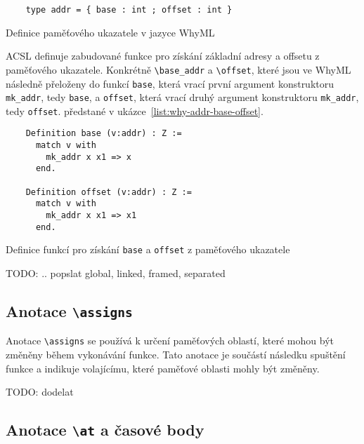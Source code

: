 \begin{listing}[H]
    \begin{verbatim}
    type addr = { base : int ; offset : int }
    \end{verbatim}
    \caption{Definice paměťového ukazatele v jazyce WhyML}
    \label{list:why-addr}
\end{listing}

ACSL definuje zabudované funkce pro získání základní adresy a offsetu z paměťového ukazatele.
Konkrétně \texttt{\textbackslash base\_addr} a \texttt{\textbackslash offset},
které jsou ve WhyML následně přeloženy do funkcí \texttt{base},
která vrací první argument konstruktoru \texttt{mk\_addr}, tedy \texttt{base},
a \texttt{offset}, která vrací druhý argument konstruktoru \texttt{mk\_addr}, tedy \texttt{offset}.
předstané v ukázce~\ref{list:why-addr-base-offset}.

\begin{listing}[H]
    \begin{verbatim}
    Definition base (v:addr) : Z :=
      match v with
        mk_addr x x1 => x
      end.

    Definition offset (v:addr) : Z :=
      match v with
        mk_addr x x1 => x1
      end.
    \end{verbatim}
    \caption{Definice funkcí pro získání \texttt{base} a \texttt{offset} z paměťového ukazatele}
    \label{list:why-addr-base-offset}
\end{listing}


TODO: .. popslat global, linked, framed, separated

\subsection{Anotace \texttt{\textbackslash assigns}}
\label{subsec:acsl-anotace-assigns}

Anotace \texttt{\textbackslash assigns} se používá k určení paměťových oblastí,
které mohou být změněny během vykonávání funkce.
Tato anotace je součástí následku spuštění funkce
a indikuje volajícímu, které paměťové oblasti mohly být změněny.

TODO: dodelat


\subsection{Anotace \texttt{\textbackslash at} a časové body}
\label{subsec:acsl-anotace-at-a-casove-body}


